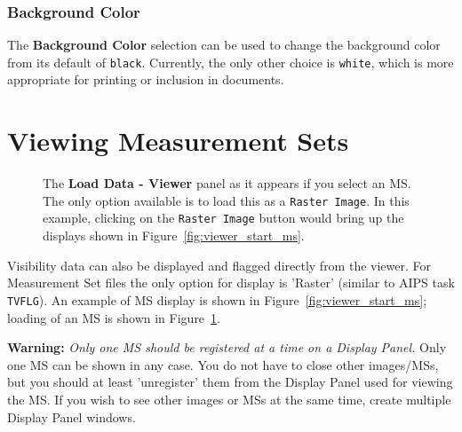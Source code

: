 \subsubsection{Background Color}
\label{section:display.viewerGUI.canvas.background}

The {\bf Background Color} selection can be used to change the
background color from its default of {\tt black}.  Currently,
the only other choice is {\tt white}, which is more appropriate
for printing or inclusion in documents.

\section{Viewing Measurement Sets}
\label{section:display.ms}

\begin{figure}[h!]
\begin{center}
\caption{\label{fig:viewer_load_ms} The {\bf Load Data - Viewer} panel
as it appears if you select an MS.  The only option available is
to load this as a {\tt Raster Image}.  In this example, clicking
on the {\tt Raster Image} button would bring up the displays shown
in Figure~\ref{fig:viewer_start_ms}.}
\hrulefill
\end{center}
\end{figure}

Visibility data can also be displayed and flagged directly from the
viewer. For Measurement Set files the only option for display is 'Raster'
(similar to AIPS task {\tt TVFLG}).  An example of MS display is
shown in Figure~\ref{fig:viewer_start_ms}; loading of an
MS is shown in Figure~\ref{fig:viewer_load_ms}.  

{\bf Warning:} {\em Only one MS should be registered at a time on a
Display Panel.} 
Only one MS can be shown in any case.  
You do not have to close other images/MSs, but you should at
least 'unregister' them from the Display Panel used for viewing the MS.
If you wish to see other images or MSs at the same time, create multiple
Display Panel windows.

 


